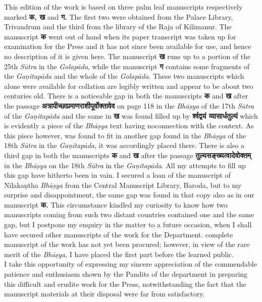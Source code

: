 \documentclass[11pt, openany]{book}
\begin{document}
{\en This edition of the work is based on three palm leaf manuscripts respectively marked} \textbf{ क, ख} {\en and} \textbf{ग.} {\en The first two were obtained from the Palace Library, Trivandrum and the third from the library of the Raja of Kilimanur. The manuscript} \textbf{क} {\en went out of hand when its paper transcript was taken up for examination for the Press and it has not since been available for use, and hence no description of it is given here. The manuscript} \textbf{ख} {\en runs up to a portion of the 25th \emph{Sūtra} in the \emph{Golapāda}, while the manuscript} \textbf{ग} {\en contains some fragments of the \emph{Gaṇitapāda} and the whole of the \emph{Golapāda}. These two manuscripts which alone were available for collation are legibly written and appear to be about two centuries old. There
is a noticeable gap in both the manuscripts} \textbf{क} {\en and} \textbf{ख} {\en after the passage} \textbf{अत्रापीच्छाप्रमाणराशीपूर्वोक्तावेव} {\en on page 118 in the \emph{Bhāṣya} of the 17th \emph{Sūtra} of the \emph{Gaṇitapāda} and the same in} \textbf{ख} {\en was found filled up by} \textbf{र्श्वद्वयं व्यासार्धतुल्यं} {\en which is evidently a piece of the \emph{Bhāṣya} text having noconnection with the context. As this piece however, was found to fit in another gap found in the \emph{Bhāṣya} of the 18th
\emph{Sūtra} in the \emph{Gaṇitapāda}, it was accordingly placed there. There is also a third gap in both the manuscripts} \textbf{क} {\en and} \textbf{ख}
{\en after the passage} \textbf{तुल्यसङ्ख्यत्वादेवोक्तम्} {\en in the \emph{Bhāṣya} on the
18th \emph{Sūtra} in the \emph{Gaṇitapāda}. All my attempts to fill up this gap have hitherto been in vain. I secured a loan of the manuscript of Nīlakaṇtha \emph{Bhāṣya} from the Central Manuscript Library, Baroda, but to my surprise and disappointment, the same gap was found in that copy also as in our manuscript} \textbf{क.} {\en This circumstance kindled my curiosity to know how two manuscripts coming from such two distant countries contained one and the same gap, but I postpone my enquiry in the matter to a future occasion, when I shall have secured other manuscripts of the work for the Department. complete manuscript of the work has not yet been procured; however, in view of the rare merit of the \emph{Bhāṣya}, I have placed the first part before the learned public.\\

I take this opportunity of expressing my sincere appreciation of the commendable patience and enthusiasm shown by the Pandits of the department in preparing this difficult and erudite work for the Press, notwithstanding the fact that the manuscript materials at their disposal were far from satisfactory.}
\end{document}
